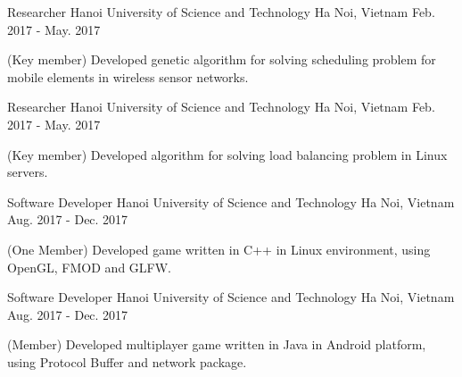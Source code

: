 


\begin{cventries}


\cventry
{Researcher} %
{Hanoi University of Science and Technology} %
{Ha Noi, Vietnam} %
{Feb. 2017 - May. 2017} %
{ %
\begin{cvitems}
\item {(Key member) Developed genetic algorithm for solving scheduling problem for mobile elements in wireless sensor networks.}
\end{cvitems}
}


\cventry
{Researcher} %
{Hanoi University of Science and Technology} %
{Ha Noi, Vietnam} %
{Feb. 2017 - May. 2017} %
{ %
\begin{cvitems}
\item {(Key member) Developed algorithm for solving load balancing problem in Linux servers.}
\end{cvitems}
}


\cventry
{Software Developer} %
{Hanoi University of Science and Technology} %
{Ha Noi, Vietnam} %
{Aug. 2017 - Dec. 2017} %
{ %
\begin{cvitems}
\item {(One Member) Developed game written in C++ in Linux environment, using OpenGL, FMOD and GLFW.} 
\end{cvitems}
}


\cventry
{Software Developer} %
{Hanoi University of Science and Technology} %
{Ha Noi, Vietnam} %
{Aug. 2017 - Dec. 2017} %
{ %
\begin{cvitems}
\item {(Member) Developed multiplayer game written in Java in Android platform, using Protocol Buffer and network package.}
\end{cvitems}
}


\end{cventries}
